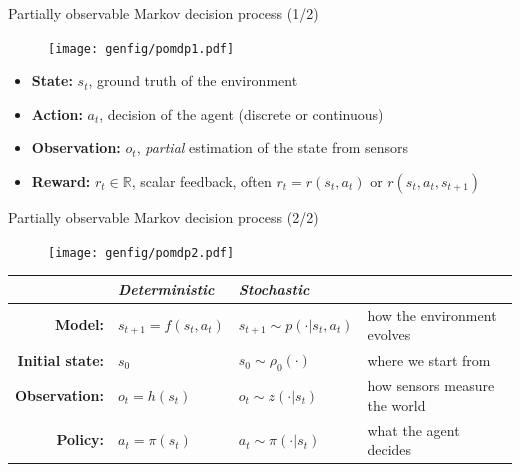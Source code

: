 \documentclass[10pt, aspectratio=1610]{beamer}
\begin{document}
\begin{frame}{Partially observable Markov decision process (1/2)}
    \begin{figure}
        \texttt{[image: genfig/pomdp1.pdf]}
    \end{figure}
    \begin{itemize}
        \item \textbf{State:} $s_t$, ground truth of the environment
        \item \textbf{Action:} $a_t$, decision of the agent (discrete or continuous)
        \item \textbf{Observation:} $o_t$, \emph{partial} estimation of the state from sensors
        \item \textbf{Reward:} $r_t \in \mathbb{R}$, scalar feedback, often $r_t = r(s_t, a_t)$ or $r(s_t, a_t, s_{t+1})$
    \end{itemize}
    \vspace{-1em}
\end{frame}

\begin{frame}{Partially observable Markov decision process (2/2)}
    \begin{figure}
        \texttt{[image: genfig/pomdp2.pdf]}
    \end{figure}
    \begin{table}
        \begin{tabular}{rlll}
            & \emph{Deterministic} & \emph{Stochastic} \\
            \hline
            \textbf{Model:} & $s_{t+1} = f(s_t, a_t)$ & $s_{t+1} \sim p(\cdot | s_t, a_t)$ & how the environment evolves \\
            \textbf{Initial state:} & $s_0$ & $s_0 \sim \rho_0(\cdot)$ & where we start from \\
            \textbf{Observation:} & $o_t = h(s_t)$ & $o_t \sim z(\cdot | s_t)$ & how sensors measure the world \\
            \textbf{Policy:} & $a_t = \pi(s_t)$ & $a_t \sim \pi(\cdot | s_t)$ & what the agent decides
        \end{tabular}
    \end{table}
\end{frame}
\end{document}
